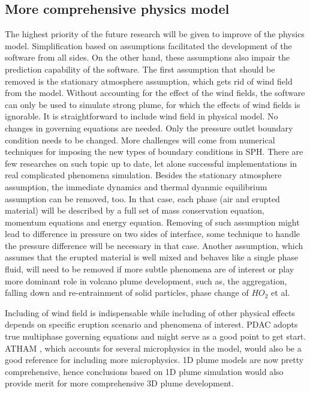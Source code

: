 \subsection{More comprehensive physics model}
The highest priority of the future research will be given to improve of the physics model. Simplification based on assumptions facilitated the development of the software from all sides. On the other hand, these assumptions also impair the prediction capability of the software. The first assumption that should be removed is the stationary atmosphere assumption, which gets rid of wind field from the model. Without accounting for the effect of the wind fields, the software can only be used to simulate strong plume, for which the effects of wind fields is ignorable. It is straightforward to include wind field in physical model. No changes in governing equations are needed. Only the pressure outlet boundary condition needs to be changed. More challenges will come from numerical techniques for imposing the new types of boundary conditions in SPH. There are few researches on such topic up to date, let alone successful implementations in real complicated phenomena simulation. Besides the stationary atmosphere assumption, the immediate dynamics and thermal dyanmic equilibrium assumption can be removed, too. In that case, each phase (air and erupted material) will be described by a full set of mass conservation equation, momentum equations and energy equation. Removing of such assumption might lead to difference in pressure on two sides of interface, some technique to handle the pressure difference will be necessary in that case. Another assumption, which assumes that the erupted material is well mixed and behaves like a single phase fluid, will need to be removed if more subtle phenomena are of interest or play more dominant role in volcano plume development, such as, the aggregation, falling down and re-entrainment of solid particles, phase change of $HO_2$ et al. 

Including of wind field is indispensable while including of other physical effects depends on specific eruption scenario and phenomena of interest. PDAC\citep{neri2003multiparticle} adopts true multiphase governing equations and might serve as a good point to get start. ATHAM  \citep{oberhuber1998volcanic}, which accounts for several microphysics in the model, would also be a good reference for including more microphysics. 1D plume models \citep{bursik2001effect, pouget2016sensitivity, folch2016fplume} are now pretty comprehensive, hence conclusions based on 1D plume simulation would also provide merit for more comprehensive 3D plume development.

